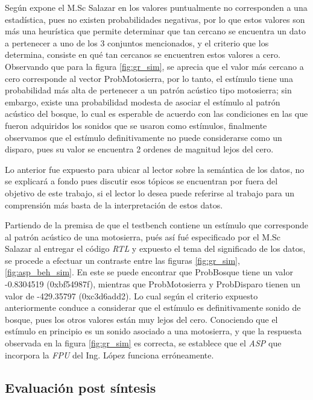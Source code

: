 Según expone el M.Sc Salazar en \cite{Carlosthesis} los valores puntualmente no corresponden a una estadística, pues no existen probabilidades negativas, por lo que estos valores son más una heurística que permite determinar que tan cercano se encuentra un dato a pertenecer a uno de los 3 conjuntos mencionados, y el criterio que los determina, consiste en qué tan cercanos se encuentren estos valores a cero. Observando que para la figura \ref{fig:gr_sim}, se aprecia que el valor más cercano a cero corresponde al vector ProbMotosierra, por lo tanto, el estímulo tiene una probabilidad más alta de pertenecer a un patrón acústico tipo motosierra; sin embargo, existe una probabilidad modesta de asociar el estímulo al patrón acústico del bosque, lo cual es esperable de acuerdo con las condiciones en las que fueron adquiridos los sonidos que se usaron como estímulos, finalmente observamos que el estímulo definitivamente no puede considerarse como un disparo, pues su valor se encuentra 2 ordenes de magnitud lejos del cero.

Lo anterior fue expuesto para ubicar al lector sobre la semántica de los datos, no se explicará a fondo pues discutir esos tópicos se encuentran por fuera del objetivo de este trabajo, si el lector lo desea puede referirse al trabajo \cite{Carlosthesis} para un comprensión más basta de la interpretación de estos datos.

Partiendo de la premisa de que el testbench contiene un estímulo que corresponde al patrón acústico de una motosierra, pués así fué especificado por el M.Sc Salazar al entregar el código \textit{RTL} y expuesto el tema del significado de los datos, se procede a efectuar un contraste entre las figuras \ref{fig:gr_sim}, \ref{fig:asp_beh_sim}. En este se puede encontrar que ProbBosque tiene un valor -0.8304519 (0xbf54987f), mientras que ProbMotosierra y ProbDisparo tienen un valor de -429.35797 (0xc3d6add2). Lo cual según el criterio expuesto anteriormente conduce a considerar que el estímulo es definitivamente sonido de bosque, pues los otros valores están muy lejos del cero. Conociendo que el estímulo en principio es un sonido asociado a una motosierra, y que la respuesta observada en la figura \ref{fig:gr_sim} es correcta, se establece que el \textit{ASP} que incorpora la \textit{FPU} del Ing. López funciona erróneamente. 

\subsection{Evaluación post síntesis}

